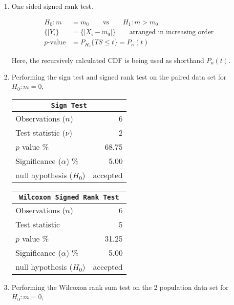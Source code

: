 \begin{enumerate}
	\item One sided signed rank test.
	
	\begin{align}
		H_0 : m &= m_0 \qquad \text{vs} \qquad H_1 : m > m_0 \nonumber \\
		\{|Y_i\} &= \{|X_i - m_0|\} \qquad \text{arranged in increasing order} \nonumber \\
		p \text{-value} &= P_{H_0} \{TS \leq t\} = P_n (t)
	\end{align}

	Here, the recursively calculated CDF is being used as shorthand $ P_n (t) $.
	
	\item Performing the sign test and signed rank test on the paired data set for $ H_0 : m = 0 $,
	
	\begin{table}[H]
		\centering
		\begin{tabular}{@{}lr@{}}
			\toprule
			\multicolumn{2}{c}{\texttt{Sign Test}} \\
			\midrule
			Observations ($n$)         &         6 \\
			Test statistic ($\nu$)     &         2 \\
			$p$ value \%               &     68.75 \\
			Significance ($\alpha$) \% &      5.00 \\
			null hypothesis ($H_0$)    &  accepted \\
			\bottomrule
		\end{tabular}
		\qquad
		\begin{tabular}{@{}lr@{}}
			\toprule
			\multicolumn{2}{c}{\texttt{Wilcoxon Signed Rank Test}} \\
			\midrule
			Observations ($n$)         &         6 \\
			Test statistic             &         5 \\
			$p$ value \%               &     31.25 \\
			Significance ($\alpha$) \% &      5.00 \\
			null hypothesis ($H_0$)    &  accepted \\
			\bottomrule
		\end{tabular}
	\end{table}
	\bigskip
	
	\item Performing the Wilcoxon rank sum test on the 2 population data set for $ H_0 : m = 0 $,
	

\end{enumerate}
